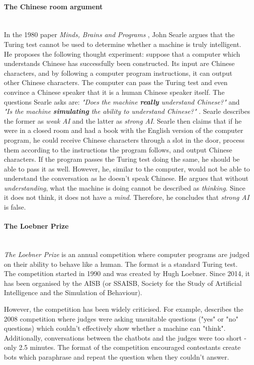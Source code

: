 \documentclass[12pt,a4paper]{article}
\newcommand{\myparagraph}[1]{\paragraph{#1}\mbox{}\\}
\begin{document}
\myparagraph{The Chinese room argument}
In the 1980 paper \textit{Minds, Brains and Programs} \cite{Searle1980}, John Searle argues that the Turing test cannot be used to determine whether a machine is truly intelligent. He proposes the following thought experiment: suppose that a computer which understands Chinese has successfully been constructed. Its input are Chinese characters, and by following a computer program instructions, it can output other Chinese characters. The computer can pass the Turing test and even convince a Chinese speaker that it is a human Chinese speaker itself. The questions Searle asks are: \textit{"Does the machine \textbf{really} understand Chinese?"} and \textit{"Is the machine \textbf{simulating} the ability to understand Chinese?"} \cite[p.~2]{Searle1980}. Searle describes the former as \textit{weak AI} and the latter as \textit{strong AI}. Searle then claims that if he were in a closed room and had a book with the English version of the computer program, he could receive Chinese characters through a slot in the door, process them according to the instructions the program follows, and output Chinese characters. If the program passes the Turing test doing the same, he should be able to pass it as well. However, he, similar to the computer, would not be able to understand the conversation as he doesn't speak Chinese. He argues that without \textit{understanding}, what the machine is doing cannot be described as \textit{thinking}. Since it does not think, it does not have a \textit{mind}. Therefore, he concludes that \textit{strong AI} is false.

\myparagraph{The Loebner Prize}
\textit{The Loebner Prize} is an annual competition where computer programs are judged on their ability to behave like a human. The format is a standard Turing test. The competition started in 1990 and was created by Hugh Loebner. Since 2014, it has been organised by the AISB (or SSAISB, Society for the Study of Artificial Intelligence and the Simulation of Behaviour).

However, the competition has been widely criticised. For example, \cite{Floridi2009} describes the 2008 competition where judges were asking unsuitable questions ("yes" or "no" questions) which couldn't effectively show whether a machine can "think". Additionally, conversations between the chatbots and the judges were too short - only 2.5 minutes. The format of the competition encouraged contestants create bots which paraphrase and repeat the question when they couldn't answer.
\end{document}
